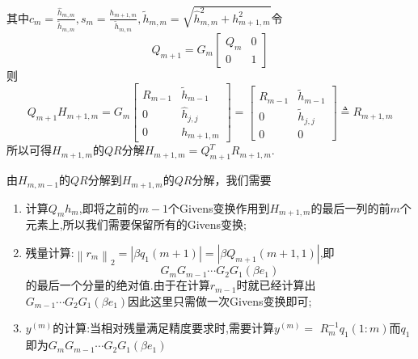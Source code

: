 \documentclass[12pt,a4paper]{article}
\begin{document}
\begin{enumerate}[(1)]
$$$$
其中$c_{m}=\frac{\hat{h}_{m, m}}{\tilde{h}_{m, m}}, s_{m}=\frac{h_{m+1, m}}{\tilde{h}_{m, m}}, \tilde{h}_{m, m}=\sqrt{\hat{h}_{m, m}^{2}+h_{m+1, m}^{2}}$令
$$
Q_{m+1}=G_{m}\left[\begin{array}{cc}{Q_{m}} & {0} \\ {0} & {1}\end{array}\right]
$$
则
$$
Q_{m+1} H_{m+1, m}=G_{m}\left[\begin{array}{cc}{R_{m-1}} & {\tilde{h}_{m-1}} \\ {0} & {\hat{h}_{j, j}} \\ {0} & {h_{m+1, m}}\end{array}\right]=\left[\begin{array}{cc}{R_{m-1}} & {\tilde{h}_{m-1}} \\ {0} & {\tilde{h}_{j, j}} \\ {0} & {0}\end{array}\right] \triangleq R_{m+1, m}
$$
所以可得$H_{m+1, m}$的$QR$分解$H_{m+1, m}=Q_{m+1}^{T} R_{m+1, m}$.
\end{enumerate}
由$H_{m, m-1}$的$QR$分解到$H_{m+1, m}$的$QR$分解，我们需要
\begin{enumerate}[(1)]
\item 计算$Q_{m} h_{m}$,即将之前的$m-1$个Givens变换作用到$H_{m+1, m}$的最后一列的前$m$个元素上,所以我们需要保留所有的Givens变换;
\item 残量计算:$\left\|r_{m}\right\|_{2}=\left|\beta q_{1}(m+1)\right|=\left|\beta Q_{m+1}(m+1,1)\right|$,即
$$
G_{m} G_{m-1} \cdots G_{2} G_{1}\left(\beta e_{1}\right)
$$
的最后一个分量的绝对值.由于在计算$r_{m-1}$时就已经计算出$G_{m-1} \cdots G_{2} G_{1}\left(\beta e_{1}\right)$因此这里只需做一次Givens变换即可;
\item $y^{(m)}$的计算:当相对残量满足精度要求时,需要计算$y^{(m)}=$ $R_{m}^{-1} q_{1}(1 : m)$而$q_{1}$即为$G_{m} G_{m-1} \cdots G_{2} G_{1}\left(\beta e_{1}\right)$
\end{enumerate}
\end{document}
